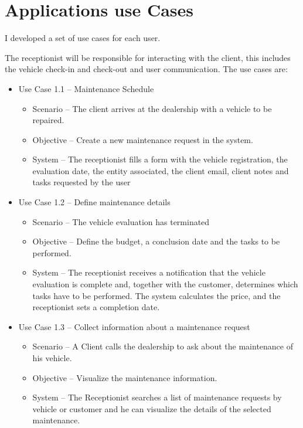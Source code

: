 \section{Applications use Cases} 
I developed a set of use cases for each user.

The receptionist will be responsible for interacting with the client, this includes the vehicle check-in and check-out and user communication. 
The use cases are:

\begin{itemize}
    \item Use Case 1.1 – Maintenance Schedule
    \begin{itemize}
      \item Scenario – The client arrives at the dealership with a vehicle to be repaired.
      \item Objective – Create a new maintenance request in the system.
      \item System – The receptionist fills a form with the vehicle registration, the evaluation date, the entity associated, the client email, client notes and tasks requested by the user
    \end{itemize}
        \item Use Case 1.2 – Define maintenance details
    \begin{itemize}
      \item Scenario – The vehicle evaluation has terminated
      \item Objective – Define the budget, a conclusion date and the tasks to be performed.
      \item System – The receptionist receives a notification that the vehicle evaluation is complete and, together with the customer, determines which tasks have to be performed. The system calculates the price, and the receptionist sets a completion date.
    \end{itemize}
    \item Use Case 1.3 – Collect information about a maintenance request
    \begin{itemize}
      \item Scenario – A Client calls the dealership to ask about the maintenance of his vehicle.
      \item Objective – Visualize the maintenance information.
      \item System –  The Receptionist searches a list of maintenance requests by vehicle or customer and he can visualize the details of the selected maintenance.
    \end{itemize}

\end{itemize}
